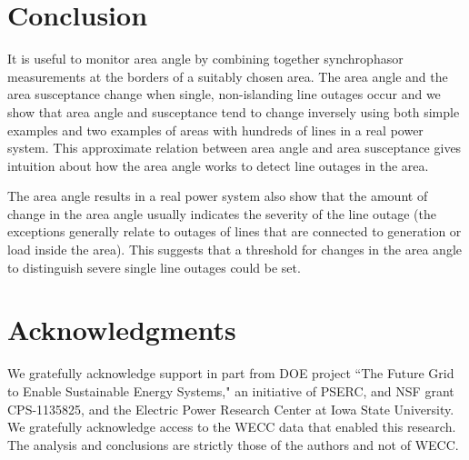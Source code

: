 \documentclass[conference]{IEEEtran}
\begin{document}
\section{Conclusion}
\label{conclusion}

 It is useful to monitor area angle by combining together synchrophasor measurements at the borders of a suitably chosen area.
The area angle and the area susceptance change when single, non-islanding line outages occur and we show that area angle and susceptance tend to change inversely
using both simple examples and two examples of areas  with hundreds of lines in a real power system.
This approximate relation between area angle and area susceptance gives intuition about how the area angle works
to detect line outages in the area.

The area angle results in a real power system also show that the amount of change in the area angle usually indicates the severity of the line outage
(the exceptions generally relate to outages of lines that are connected to generation or load inside the area).
This suggests that a threshold for changes in the area angle to distinguish severe single line outages could be set.

\newpage
\section*{Acknowledgments}
\label{ack}
We gratefully acknowledge support in part from 
DOE project ``The Future Grid to Enable Sustainable Energy Systems," an initiative of PSERC, 
and
NSF grant CPS-1135825, and the  Electric Power Research Center at Iowa State University.
We gratefully acknowledge access to the WECC data that enabled this research.
The analysis and conclusions are strictly those of the authors and not of WECC.

\newpage
\end{document}
